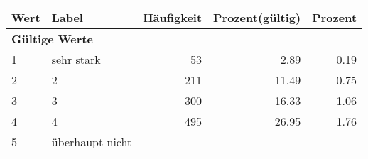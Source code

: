      \begin{longtable}{lXrrr}
     \toprule
     \textbf{Wert} & \textbf{Label} & \textbf{Häufigkeit} & \textbf{Prozent(gültig)} & \textbf{Prozent} \\
     \endhead
     \midrule
     \multicolumn{5}{l}{\textbf{Gültige Werte}}\\

     1 &
     \multicolumn{1}{X}{ sehr stark   } &


       \num{53} &
       \num[round-mode=places,round-precision=2]{2.89} &
         \num[round-mode=places,round-precision=2]{0.19} \\

     2 &
     \multicolumn{1}{X}{ 2   } &


       \num{211} &
       \num[round-mode=places,round-precision=2]{11.49} &
         \num[round-mode=places,round-precision=2]{0.75} \\

     3 &
     \multicolumn{1}{X}{ 3   } &


       \num{300} &
       \num[round-mode=places,round-precision=2]{16.33} &
         \num[round-mode=places,round-precision=2]{1.06} \\

     4 &
     \multicolumn{1}{X}{ 4   } &


       \num{495} &
       \num[round-mode=places,round-precision=2]{26.95} &
         \num[round-mode=places,round-precision=2]{1.76} \\

     5 &
     \multicolumn{1}{X}{ überhaupt nicht   } &



\end{longtable}
